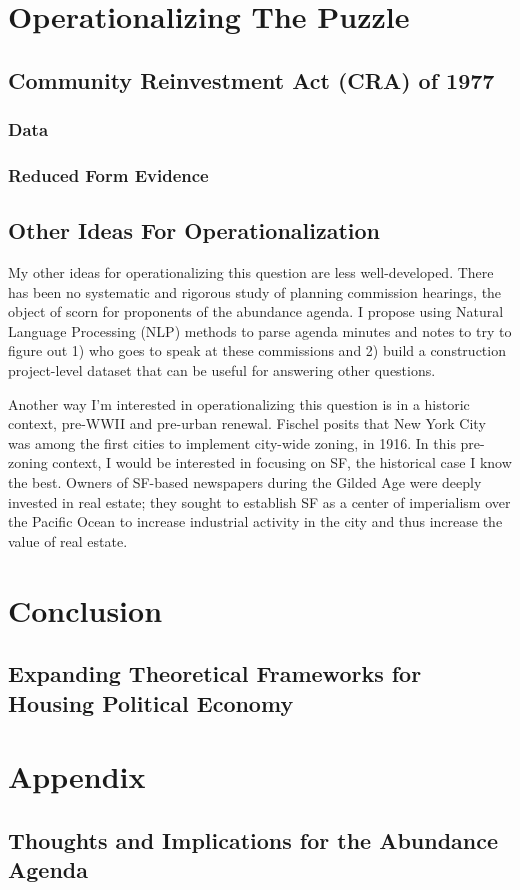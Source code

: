 \documentclass{article}[11pt]
\begin{document}
\section{Operationalizing The Puzzle}

	\subsection{Community Reinvestment Act (CRA) of 1977}

		\subsubsection{Data}


		\subsubsection{Reduced Form Evidence}



	\subsection{Other Ideas For Operationalization}
My other ideas for operationalizing this question are less well-developed. There has been no systematic and rigorous study of planning commission hearings, the object of scorn for proponents of the abundance agenda. I propose using Natural Language Processing (NLP) methods to parse agenda minutes and notes to try to figure out 1) who goes to speak at these commissions and 2) build a construction project-level dataset that can be useful for answering other questions. 

Another way I'm interested in operationalizing this question is in a historic context, pre-WWII and pre-urban renewal. Fischel posits that New York City was among the first cities to implement city-wide zoning, in 1916. \citep{fischel2004economic} In this pre-zoning context, I would be interested in focusing on SF, the historical case I know the best. Owners of SF-based newspapers during the Gilded Age were deeply invested in real estate; they sought to establish SF as a center of imperialism over the Pacific Ocean to increase industrial activity in the city and thus increase the value of real estate. \citep{brechin2006imperial} 

\section{Conclusion}

	\subsection{Expanding Theoretical Frameworks for Housing Political Economy}
	


\section{Appendix}

	\subsection{Thoughts and Implications for the Abundance Agenda}
	

\printbibliography
\end{document}
